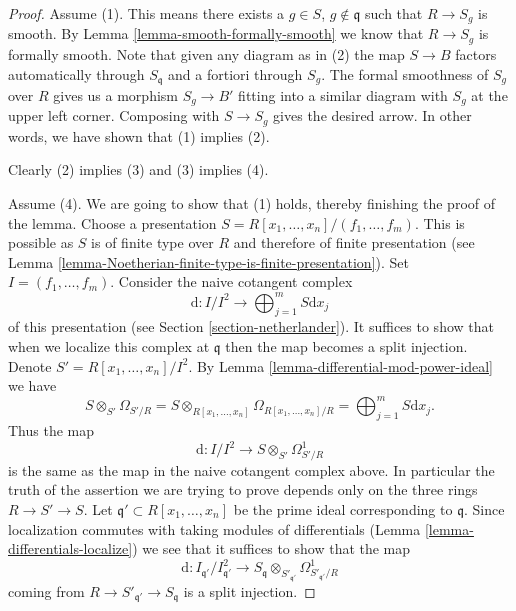 \begin{proof}
Assume (1). This means there exists a $g \in S$, $g \not \in \mathfrak q$
such that $R \to S_g$ is smooth. By Lemma \ref{lemma-smooth-formally-smooth}
we know that $R \to S_g$ is formally smooth. Note that given any diagram
as in (2) the map $S \to B$ factors automatically through $S_{\mathfrak q}$
and a fortiori through $S_g$. The formal smoothness of $S_g$ over $R$
gives us a morphism $S_g \to B'$ fitting into a similar diagram with $S_g$ at
the upper left corner. Composing with $S \to S_g$ gives the desired arrow.
In other words, we have shown that (1) implies (2).

\medskip\noindent
Clearly (2) implies (3) and (3) implies (4).

\medskip\noindent
Assume (4). We are going to show that (1) holds, thereby finishing the
proof of the lemma. Choose a presentation
$S = R[x_1, \ldots, x_n]/(f_1, \ldots, f_m)$.
This is possible as $S$ is of finite type over $R$ and therefore of finite
presentation (see
Lemma \ref{lemma-Noetherian-finite-type-is-finite-presentation}).
Set $I = (f_1, \ldots, f_m)$.
Consider the naive cotangent complex
$$
\text{d} : I/I^2
\longrightarrow
\bigoplus\nolimits_{j = 1}^m S\text{d}x_j
$$
of this presentation (see Section \ref{section-netherlander}).
It suffices to show that when we localize this complex at $\mathfrak q$
then the map becomes a split injection.
Denote $S' = R[x_1, \ldots, x_n]/I^2$.
By Lemma \ref{lemma-differential-mod-power-ideal} we have
$$
S \otimes_{S'} \Omega_{S'/R} =
S \otimes_{R[x_1, \ldots, x_n]} \Omega_{R[x_1, \ldots, x_n]/R} =
\bigoplus\nolimits_{j = 1}^m S\text{d}x_j.
$$
Thus the map
$$
\text{d} :
I/I^2
\longrightarrow
S \otimes_{S'} \Omega^1_{S'/R}
$$
is the same as the map in the naive cotangent complex above. In particular
the truth of the assertion we are trying to prove
depends only on the three rings $R \to S' \to S$.
Let $\mathfrak q' \subset R[x_1, \ldots, x_n]$ be the prime ideal
corresponding to $\mathfrak q$. Since
localization commutes with taking modules of differentials
(Lemma \ref{lemma-differentials-localize}) we see that it suffices to show
that the map
\begin{equation}
\label{equation-target-map}
\text{d} :
I_{\mathfrak q'}/I_{\mathfrak q'}^2
\longrightarrow
S_{\mathfrak q} \otimes_{S'_{\mathfrak q'}} \Omega^1_{S'_{\mathfrak q'}/R}
\end{equation}
coming from $R \to S'_{\mathfrak q'} \to S_{\mathfrak q}$
is a split injection.


\end{proof}
